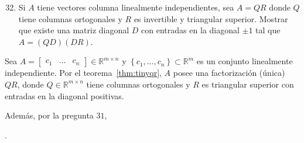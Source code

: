 \begin{frame}
	\begin{enumerate}\setcounter{enumi}{31}
		\item

		      Si $A$ tiene vectores columna linealmente independientes,
		      sea $A=QR$ donde $Q$ tiene columnas ortogonales y $R$ es
		      invertible y triangular superior.
		      Mostrar que existe una matriz diagonal $D$ con entradas en
		      la diagonal $\pm 1$ tal que
		      \begin{math}
			      A=
			      \left(QD\right)
			      \left(DR\right)
		      \end{math}.
	\end{enumerate}

	\begin{solution}
		Sea
		\begin{math}
			A=
			\begin{bmatrix}
				c_{1} & \dotsc & c_{n}
			\end{bmatrix}
			\in\mathbb{R}^{m\times n}
		\end{math}
		y
		\begin{math}
			\left\{
			c_{1},
			\dotsc,
			c_{n}
			\right\}\subset\mathbb{R}^{m}
		\end{math}
		es un conjunto linealmente independiente.
		Por el teorema~\eqref{thm:tinyqr}, $A$ posee una factorización
		(única) $QR$, donde $Q\in\mathbb{R}^{m\times n}$ tiene columnas
		ortogonales y $R$ es triangular superior con entradas en la
		diagonal positivas.

		Además, por la pregunta $31$,

	\end{solution}
\end{frame}

\begin{frame}
	\begin{solution}
		.
	\end{solution}
\end{frame}